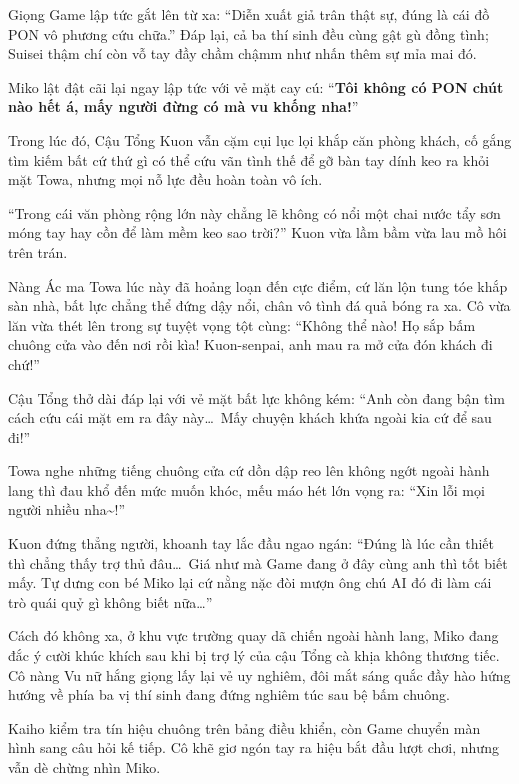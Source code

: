 \documentclass[../main.tex]{subfiles}
\begin{document}
Giọng Game lập tức gắt lên từ xa: ``Diễn xuất giả trân thật sự, đúng là cái đồ PON vô phương cứu chữa.'' Đáp lại, cả ba thí sinh đều cùng gật gù đồng tình; Suisei thậm chí còn vỗ tay đầy chầm chậmm như nhấn thêm sự mỉa mai đó.

Miko lật đật cãi lại ngay lập tức với vẻ mặt cay cú: ``\textbf{Tôi không có PON chút nào hết á, mấy người đừng có mà vu khống nha!}''

\ct

Trong lúc đó, Cậu Tổng Kuon vẫn cặm cụi lục lọi khắp căn phòng khách, cố gắng tìm kiếm bất cứ thứ gì có thể cứu vãn tình thế để gỡ bàn tay dính keo ra khỏi mặt Towa, nhưng mọi nỗ lực đều hoàn toàn vô ích.

``Trong cái văn phòng rộng lớn này chẳng lẽ không có nổi một chai nước tẩy sơn móng tay hay cồn để làm mềm keo sao trời?'' Kuon vừa lầm bầm vừa lau mồ hôi trên trán.

Nàng Ác ma Towa lúc này đã hoảng loạn đến cực điểm, cứ lăn lộn tung tóe khắp sàn nhà, bất lực chẳng thể đứng dậy nổi, chân vô tình đá quả bóng ra xa. Cô vừa lăn vừa thét lên trong sự tuyệt vọng tột cùng: ``Không thể nào! Họ sắp bấm chuông cửa vào đến nơi rồi kìa! Kuon-senpai, anh mau ra mở cửa đón khách đi chứ!''


Cậu Tổng thở dài đáp lại với vẻ mặt bất lực không kém: ``Anh còn đang bận tìm cách cứu cái mặt em ra đây này\dots\ Mấy chuyện khách khứa ngoài kia cứ để sau đi!''

Towa nghe những tiếng chuông cửa cứ dồn dập reo lên không ngớt ngoài hành lang thì đau khổ đến mức muốn khóc, mếu máo hét lớn vọng ra: ``Xin lỗi mọi người nhiều nha\~{}!''

Kuon đứng thẳng người, khoanh tay lắc đầu ngao ngán: ``Đúng là lúc cần thiết thì chẳng thấy trợ thủ đâu\dots\ Giá như mà Game đang ở đây cùng anh thì tốt biết mấy. Tự dưng con bé Miko lại cứ nằng nặc đòi mượn ông chú AI đó đi làm cái trò quái quỷ gì không biết nữa\dots''

\ct

Cách đó không xa, ở khu vực trường quay dã chiến ngoài hành lang, Miko đang đắc ý cười khúc khích sau khi bị trợ lý của cậu Tổng cà khịa không thương tiếc. Cô nàng Vu nữ hắng giọng lấy lại vẻ uy nghiêm, đôi mắt sáng quắc đầy hào hứng hướng về phía ba vị thí sinh đang đứng nghiêm túc sau bệ bấm chuông.

Kaiho kiểm tra tín hiệu chuông trên bảng điều khiển, còn Game chuyển màn hình sang câu hỏi kế tiếp. Cô khẽ giơ ngón tay ra hiệu bắt đầu lượt chơi, nhưng vẫn dè chừng nhìn Miko.
\end{document}
